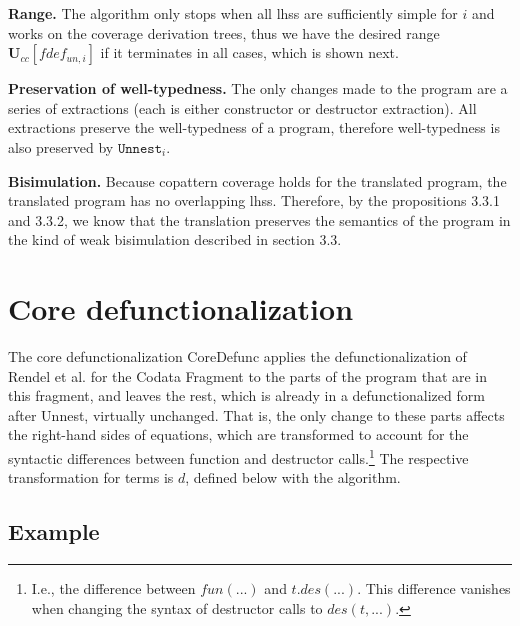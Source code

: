 \textbf{Range.} The algorithm only stops when all lhss are sufficiently simple for $i$ and works on the coverage derivation trees, thus we have the desired range $\mathbf{U}_{cc}[fdef_{un,i}]$ if it terminates in all cases, which is shown next.

\textbf{Preservation of well-typedness.} The only changes made to the program are a series of extractions (each is either constructor or destructor extraction). All extractions preserve the well-typedness of a program, therefore well-typedness is also preserved by $\texttt{Unnest}_i$.

\textbf{Bisimulation.} Because copattern coverage holds for the translated program, the translated program has no overlapping lhss. Therefore, by the propositions 3.3.1 and 3.3.2, we know that the translation preserves the semantics of the program in the kind of weak bisimulation described in section 3.3.

\section{Core defunctionalization}
\label{sec:coredefunc}

The core defunctionalization \textsf{CoreDefunc} applies the defunctionalization of Rendel et al. for the Codata Fragment to the parts of the program that are in this fragment, and leaves the rest, which is already in a defunctionalized form after \textsf{Unnest}, virtually unchanged. That is, the only change to these parts affects the right-hand sides of equations, which are transformed to account for the syntactic differences between function and destructor calls.\footnote{I.e., the difference between $fun(...)$ and $t.des(...)$. This difference vanishes when changing the syntax of destructor calls to $des(t, ...)$.} The respective transformation for terms is $d$, defined below with the algorithm.

\subsection{Example}

